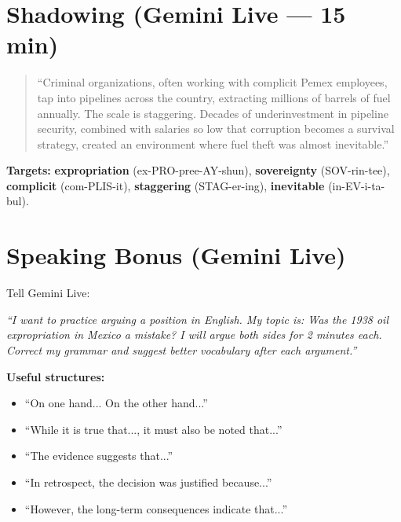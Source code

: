 \documentclass[10pt,a4paper]{article}
\begin{document}
\section*{Shadowing (Gemini Live --- 15 min)}

\begin{quote}\small
``Criminal organizations, often working with complicit Pemex
employees, tap into pipelines across the country, extracting
millions of barrels of fuel annually. The scale is staggering.
Decades of underinvestment in pipeline security, combined with
salaries so low that corruption becomes a survival strategy,
created an environment where fuel theft was almost inevitable.''
\end{quote}

\textbf{Targets:} \textbf{expropriation} (ex-PRO-pree-AY-shun),
\textbf{sovereignty} (SOV-rin-tee), \textbf{complicit}
(com-PLIS-it), \textbf{staggering} (STAG-er-ing),
\textbf{inevitable} (in-EV-i-ta-bul).

\section*{Speaking Bonus (Gemini Live)}

\begin{tcolorbox}[colback=white, colframe=black]
Tell Gemini Live:

\textit{``I want to practice arguing a position in English. My topic
is: Was the 1938 oil expropriation in Mexico a mistake? I will
argue both sides for 2 minutes each. Correct my grammar and suggest
better vocabulary after each argument.''}

\textbf{Useful structures:}
\begin{itemize}[nosep]
\item ``On one hand... On the other hand...''
\item ``While it is true that..., it must also be noted that...''
\item ``The evidence suggests that...''
\item ``In retrospect, the decision was justified because...''
\item ``However, the long-term consequences indicate that...''
\end{itemize}
\end{tcolorbox}
\end{document}
